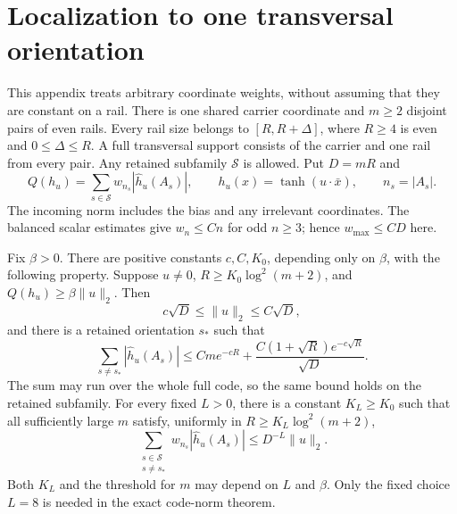 \section{Localization to one transversal orientation}
\label{app:code-orientation-localization}

This appendix treats arbitrary coordinate weights, without assuming
that they are constant on a rail. There is one shared carrier coordinate
and $m\ge2$ disjoint pairs of even rails. Every rail size belongs to
$[R,R+\Delta]$, where $R\ge4$ is even and $0\le\Delta\le R$.
A full transversal support consists of the carrier and one rail from
every pair. Any retained subfamily $\mathcal S$ is allowed. Put $D=mR$
and
\[
 Q(h_u)=\sum_{s\in\mathcal S}w_{n_s}|\widehat h_u(A_s)|,
 \qquad h_u(x)=\tanh(u\cdot\bar x),\qquad n_s=|A_s|.
\]
The incoming norm includes the bias and any irrelevant coordinates.
The balanced scalar estimates give $w_n\le Cn$ for odd $n\ge3$;
hence $w_{\max}\le CD$ here.

\begin{theorem}
\label{thm:code-orientation-localization}
Fix $\beta>0$. There are positive constants $c,C,K_0$, depending only
on $\beta$, with the following property. Suppose $u\ne0$,
$R\ge K_0\log^2(m+2)$, and $Q(h_u)\ge\beta\|u\|_2$.
Then
\[
 c\sqrt D\le\|u\|_2\le C\sqrt D,
\]
and there is a retained orientation $s_*$ such that
\begin{equation}\label{eq:code-off-orientation}
 \sum_{s\ne s_*}|\widehat h_u(A_s)|
 \le Cm e^{-cR}
   +\frac{C(1+\sqrt R)e^{-c\sqrt R}}{\sqrt D}.
\end{equation}
The sum may run over the whole full code, so the same bound holds on
the retained subfamily. For every fixed $L>0$, there is a constant
$K_L\ge K_0$ such that all sufficiently large $m$ satisfy, uniformly
in $R\ge K_L\log^2(m+2)$,
\begin{equation}\label{eq:code-off-superpolynomial}
 \sum_{\substack{s\in\mathcal S\\s\ne s_*}}
 w_{n_s}|\widehat h_u(A_s)|\le D^{-L}\|u\|_2.
\end{equation}
Both $K_L$ and the threshold for $m$ may depend on $L$ and $\beta$.
Only the fixed choice $L=8$ is needed in the exact code-norm theorem.
\end{theorem}

